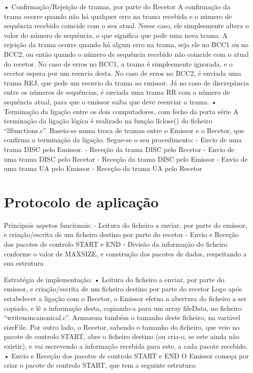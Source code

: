 \documentclass[article, a4paper, 11pt, oneside]{memoir}
\begin{document}
•	Confirmação/Rejeição de tramas, por parte do Recetor
A confirmação da trama ocorre quando não há qualquer erro na trama recebida e o número de sequência recebido coincide com o seu atual. Nesse caso, ele simplesmente altera o valor do número de sequência, o que significa que pede uma nova trama.
A rejeição da trama ocorre quando há algum erro na trama, seja ele no BCC1 ou no BCC2, ou então quando o número de sequência recebido não coincide com o atual do recetor. No caso de erros no BCC1, a trama é simplesmente ignorada, e o recetor espera por um reenvia desta. No caso de erros no BCC2, é enviada uma trama REJ, que pede um reenvio da trama ao emissor. Já no caso de discrepância entre os números de sequências, é enviada uma trama RR com o número de sequência atual, para que o emissor saiba que deve reenviar a trama.
•	Terminação da ligação entre os dois computadores, com fecho da porta série
A terminação da ligação lógica é realizado na função llclose() do ficheiro “llfunctions.c”. Baseia-se numa troca de tramas entre o Emissor e o Recetor, que confirma a terminação da ligação. Segue-se o seu procedimento:
- Envio de uma trama DISC pelo Emissor.
 - Receção da trama DISC pelo Recetor
 - Envio de uma trama DISC pelo Recetor
- Receção da trama DISC pelo Emissor
- Envio de uma trama UA pelo Emissor
- Receção da trama UA pelo Recetor


\newpage
\chapter[Protocolo de aplicação][Protocolo de aplicação]{Protocolo de aplicação} \label{\thechapter}
  
Principais aspetos funcionais:
  - Leitura do ficheiro a enviar, por parte do emissor, e criação/escrita de um ficheiro destino por parte do recetor
  - Envio e Receção dos pacotes de controlo START e END
  - Divisão da informação do ficheiro conforme o valor de MAXSIZE, e construção dos pacotes de dados, respeitando a sua estrutura

Estratégia de implementação:
•	Leitura do ficheiro a enviar, por parte do emissor, e criação/escrita de um ficheiro destino por parte do recetor
Logo após estabelecer a ligação com o Recetor, o Emissor efetua a abertura do ficheiro a ser copiado, e lê a informação desta, copiando-a para um array fileData, no ficheiro “writenoncanonical.c”. Armazena também o tamanho deste ficheiro, na variável sizeFile. Por outro lado, o Recetor, sabendo o tamanho do ficheiro, que veio no pacote de controlo START, abre o ficheiro destino (ou cria-o, se este ainda não existir), e vai escrevendo a informação recebida para este, a cada pacote recebido.
•	Envio e Receção dos pacotes de controlo START e END
O Emissor começa por criar o pacote de controlo START, que tem a seguinte estrutura:
\end{document}
